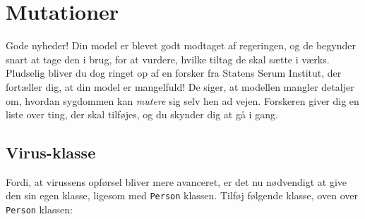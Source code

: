 \documentclass{article}
\begin{document}
\section{Mutationer}
Gode nyheder! Din model er blevet godt modtaget af regeringen, og de begynder snart at tage den i brug, for at vurdere, hvilke tiltag de skal sætte i værks. Pludselig bliver du dog ringet op af en forsker fra Statens Serum Institut, der fortæller dig, at din model er mangelfuld! De siger, at modellen mangler detaljer om, hvordan sygdommen kan \textit{mutere} sig selv hen ad vejen. Forskeren giver dig en liste over ting, der skal tilføjes, og du skynder dig at gå i gang.

\subsection{Virus-klasse}
Fordi, at virussens opførsel bliver mere avanceret, er det nu nødvendigt at give den sin egen klasse, ligesom med \texttt{Person} klassen. Tilføj følgende klasse, oven over \texttt{Person} klassen:
\end{document}
